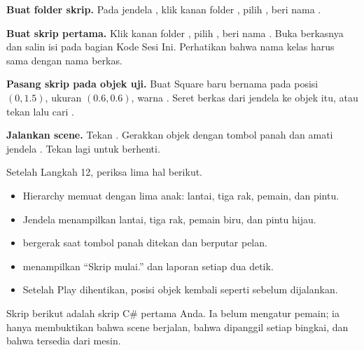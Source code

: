 \begin{langkah}
  \item \textbf{Buat folder skrip.} Pada jendela , klik kanan
        folder , pilih , beri nama
        .

  \item \textbf{Buat skrip pertama.} Klik kanan folder , pilih
        , beri nama . Buka
        berkasnya dan salin isi pada bagian Kode Sesi Ini. Perhatikan bahwa
        nama kelas harus sama dengan nama berkas.

  \item \textbf{Pasang skrip pada objek uji.} Buat Square baru bernama
         pada posisi $(0,1.5)$, ukuran $(0.6,0.6)$, warna
        . Seret berkas  dari jendela
         ke objek itu, atau tekan  lalu
        cari .

  \item \textbf{Jalankan scene.} Tekan . Gerakkan objek
         dengan tombol panah dan amati jendela
        . Tekan  lagi untuk berhenti.
\end{langkah}

\begin{ujibox}
Setelah Langkah 12, periksa lima hal berikut.
\begin{itemize}[leftmargin=1.4em, itemsep=0.2em]
  \item Hierarchy memuat  dengan lima anak: lantai, tiga rak,
        pemain, dan pintu.
  \item Jendela  menampilkan lantai, tiga rak, pemain biru, dan
        pintu hijau.
  \item {} bergerak saat tombol panah ditekan dan berputar
        pelan.
  \item {} menampilkan ``Skrip mulai.'' dan laporan setiap dua
        detik.
  \item Setelah Play dihentikan, posisi objek kembali seperti sebelum
        dijalankan.
\end{itemize}
\end{ujibox}


Skrip berikut adalah skrip C\# pertama Anda. Ia belum mengatur pemain; ia
hanya membuktikan bahwa scene berjalan, bahwa  dipanggil
setiap bingkai, dan bahwa  tersedia dari mesin.

